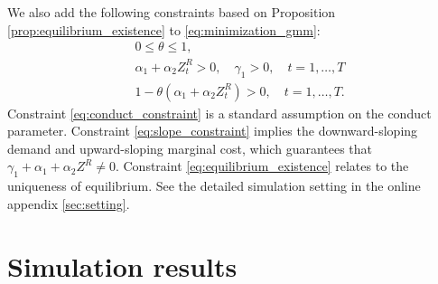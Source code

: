 \documentclass[11pt, a4paper]{article}
\theoremstyle{remark}
\begin{document}
We also add the following constraints based on Proposition \ref{prop:equilibrium_existence} to \eqref{eq:minimization_gmm}:
\begin{align}
    &0\le\theta \le 1,\label{eq:conduct_constraint}\\
    &\alpha_1 + \alpha_2 Z_{t}^{R} >0, \quad \gamma_1>0 ,\quad t = 1,\ldots, T\label{eq:slope_constraint}\\
    &1- \theta(\alpha_1 + \alpha_2 Z_{t}^{R}) >0,\quad t = 1,\ldots, T.\label{eq:equilibrium_existence}
\end{align}
Constraint \eqref{eq:conduct_constraint} is a standard assumption on the conduct parameter.
Constraint \eqref{eq:slope_constraint} implies the downward-sloping demand and upward-sloping marginal cost, which guarantees that $\gamma_1 + \alpha_1 + \alpha_2 Z^{R} \ne 0$.
Constraint \eqref{eq:equilibrium_existence} relates to the uniqueness of equilibrium. 
See the detailed simulation setting in the online appendix \ref{sec:setting}.



\section{Simulation results}\label{sec:results}
\end{document}
